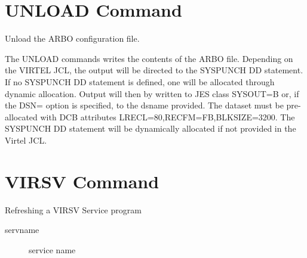 \documentclass[letterpaper,10pt,english]{sphinxmanual}
\begin{document}
\ignorespaces 

\section{UNLOAD Command}
\label{\detokenize{audit_operations_ and_performance:unload-command}}\label{\detokenize{audit_operations_ and_performance:index-32}}
Unload the ARBO configuration file.

\begin{sphinxVerbatim}[commandchars=\\\{\}]
\end{sphinxVerbatim}

The UNLOAD commands writes the contents of the ARBO file. Depending on the VIRTEL JCL, the output will be directed to the SYSPUNCH DD statement. If no SYSPUNCH DD statement is defined, one will be allocated through dynamic allocation. Output will then by written to JES class SYSOUT=B or, if the DSN= option is specified, to the dsname provided. The dataset must be pre-allocated with DCB attributes LRECL=80,RECFM=FB,BLKSIZE=3200. The SYSPUNCH DD statement will be dynamically allocated if not provided in the Virtel JCL.

\ignorespaces 

\section{VIRSV Command}
\label{\detokenize{audit_operations_ and_performance:virsv-command}}\label{\detokenize{audit_operations_ and_performance:index-33}}
Refreshing a VIRSV Service program

\begin{sphinxVerbatim}[commandchars=\\\{\}]
\end{sphinxVerbatim}
\begin{description}
\item[{servname}] \leavevmode
service name

\end{description}
\end{document}
